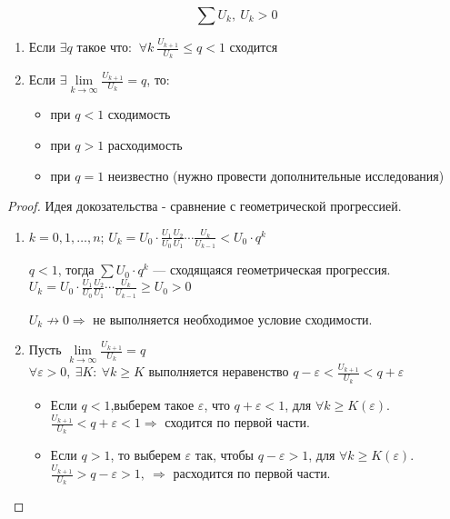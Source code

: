 \begin{theorem}
  $$\sum U_k, \ U_k > 0$$
  \begin{enumerate}
    \item Если $\exists q$ такое что:
      $\ \forall k \ \frac{U_{k+1}}{U_k} \leq q < 1$ сходится
    \item Если $\exists \lim\limits_{k \to \infty} \frac{U_{k+1}}{U_k} = q$, то:
    \begin{itemize}
      \item при $q < 1$ сходимость
      \item при $q > 1$ расходимость
      \item при $q = 1$ неизвестно (нужно провести дополнительные исследования)
    \end{itemize}
  \end{enumerate}
\end{theorem}

\begin{proof}
  Идея докозательства - сравнение с геометрической прогрессией.
  \begin{enumerate}
    \item $k = 0, 1, \dots, n$;
      $U_k = U_0 \cdot \frac{U_1}{U_0} \frac{U_2}{U_1} \cdots \frac{U_k}{U_{k-1}}
      < U_0 \cdot q^k$
      \begin{comment}
        $\frac{U_k}{U_{k-1}} < q, \ \forall k$
      \end{comment}
      $q < 1$, тогда $\sum U_0 \cdot q^k$ --- сходящаяся геометрическая прогрессия. \\
      $U_k = U_0 \cdot \frac{U_1}{U_0}\frac{U_2}{U_1}\cdots\frac{U_k}{U_{k-1}}
      \geq U_0 > 0$
      \begin{comment}
        $\frac{U_k}{U_{k-1}} \geq 1, \ \forall k$
      \end{comment}
      $U_k \not \to 0 \Rightarrow$ не выполняется необходимое условие сходимости.
    \item Пусть $\lim\limits_{k \to \infty} \frac{U_{k+1}}{U_k} = q$ \\
      $\forall \varepsilon > 0, \ \exists K : \ \forall k \geq K$
      выполняется неравенство
      $q - \varepsilon < \frac{U_{k+1}}{U_k} < q + \varepsilon$
      \begin{itemize}
        \item Если $q < 1$,выберем такое $\varepsilon$, что 
          $q + \varepsilon < 1$, для
          $\forall k \geq K(\varepsilon)$. \\
          $\frac{U_{k+1}}{U_k} < q + \varepsilon < 1 \Rightarrow$
          сходится по первой части.
        \item Если $q > 1$, то выберем $\varepsilon$ так, чтобы
          $q - \varepsilon > 1$, для
          $\forall k \geq K(\varepsilon)$. \\
          $\frac{U_{k+1}}{U_k} > q - \varepsilon > 1, \ \Rightarrow$
          расходится по первой части.
      \end{itemize}
    \end{enumerate}
\end{proof}

